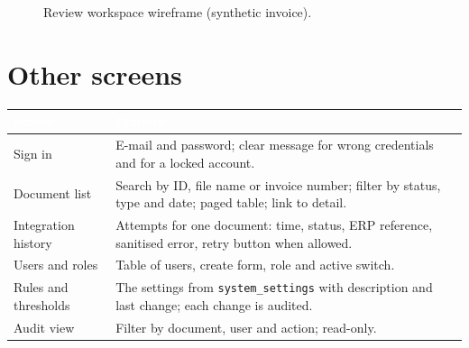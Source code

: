 \documentclass[11pt,a4paper]{report}
\newcommand{\hdr}[1]{\textcolor{white}{\sffamily\bfseries #1}}
\newcommand{\tblstart}{\rowcolors{2}{white}{rowgray}\arrayrulecolor{teal!60}}
\newcommand{\hdrrow}{\rowcolor{navy}}
\begin{document}
\begin{figure}[H]
{
}
\caption{Review workspace wireframe (synthetic invoice).}\label{fig:p2review}
\end{figure}

\section{Other screens}
{\tblstart\small
\begin{longtable}{L{3.2cm}L{10.6cm}}
\hdrrow \hdr{Screen} & \hdr{Content}\\ \endhead
Sign in & E-mail and password; clear message for wrong credentials and for a locked account.\\
Document list & Search by ID, file name or invoice number; filter by status, type and date; paged table; link to detail.\\
Integration history & Attempts for one document: time, status, ERP reference, sanitised error, retry button when allowed.\\
Users and roles & Table of users, create form, role and active switch.\\
Rules and thresholds & The settings from \texttt{system\_settings} with description and last change; each change is audited.\\
Audit view & Filter by document, user and action; read-only.\\
\hline
\end{longtable}}
\end{document}
